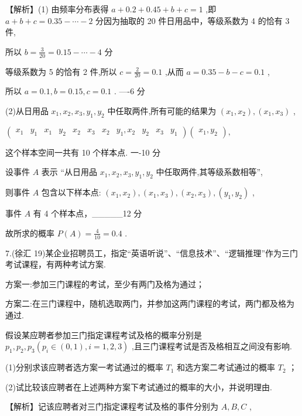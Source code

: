 \documentclass[10pt]{article}
\begin{document}
【解析】(1) 由频率分布表得 \(a + {0.2} + {0.45} + b + c = 1\) ,即 \(a + b + c = {0.35} - \cdots  - 2\) 分因为抽取的 20 件日用品中，等级系数为 4 的恰有 3 件,

所以 \(b = \frac{3}{20} = {0.15} - \cdots  - 4\) 分

等级系数为 5 的恰有 2 件,所以 \(c = \frac{2}{20} = {0.1}\) ,从而 \(a = {0.35} - b - c = {0.1}\) ,

所以 \(a = {0.1},b = {0.15},c = {0.1}\) . ----6 分

(2)从日用品 \({x}_{1},{x}_{2},{x}_{3},{y}_{1},{y}_{2}\) 中任取两件,所有可能的结果为 \(\left( {{x}_{1},{x}_{2}}\right) ,\left( {{x}_{1},{x}_{3}}\right)\) ,

\(\left( \begin{array}{lllllllllll} {x}_{1} & {y}_{1} & {x}_{1} & {y}_{2} & {x}_{2} & {x}_{3} & {x}_{2} & {y}_{1},{x}_{2} & {y}_{2} & {x}_{3} & {y}_{1} \end{array}\right) \left( \begin{array}{l} {x}_{1},{y}_{2} \end{array}\right) ,\)

这个样本空间一共有 10 个样本点. 一-10 分

设事件 \(A\) 表示 “从日用品 \({x}_{1},{x}_{2},{x}_{3},{y}_{1},{y}_{2}\) 中任取两件,其等级系数相等”,

则事件 \(A\) 包含以下样本点: \(\left( {{x}_{1},{x}_{2}}\right) ,\left( {{x}_{1},{x}_{3}}\right) ,\left( {{x}_{2},{x}_{3}}\right) ,\left( {{y}_{1},{y}_{2}}\right)\) ,

事件 \(A\) 有 4 个样本点，\_\_\_\_\_12 分

故所求的概率 \(P\left( A\right)  = \frac{4}{10} = {0.4}\) .

7.(徐汇 19)某企业招聘员工，指定“英语听说”、“信息技术”、“逻辑推理”作为三门考试课程，有两种考试方案.

方案一:参加三门课程的考试，至少有两门及格为通过；

方案二:在三门课程中，随机选取两门，并参加这两门课程的考试，两门都及格为通过.

假设某应聘者参加三门指定课程考试及格的概率分别是 \({p}_{1},{p}_{2},{p}_{3}\left( {{p}_{i} \in  \left( {0,1}\right) ,i = 1,2,3}\right)\) ,且三门课程考试是否及格相互之间没有影响.

(1)分别求该应聘者选方案一考试通过的概率 \({T}_{1}\) 和选方案二考试通过的概率 \({T}_{2}\) ；

(2)试比较该应聘者在上述两种方案下考试通过的概率的大小，并说明理由.

【解析】记该应聘者对三门指定课程考试及格的事件分别为 \(A,B,C\) ,
\end{document}
